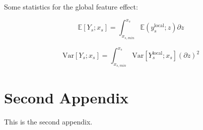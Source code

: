 \documentclass[wcp]{jmlr}
\newcommand{\Ysloc}{Y_{s}^{\text{local}}}
\newcommand{\ysloc}{y_{s}^{\text{local}}}
\newcommand{\E}{\mathbb{E}}
\newcommand{\var}{\mathrm{Var}}
\newcommand{\1}{\mathbbm{1}}
\begin{document}
Some statistics for the global feature effect:

\begin{equation}
  \E[Y_s ; x_s] = \int_{x_{s,min}}^{x_s} \E(\ysloc;z) \partial z
\end{equation}

\begin{equation}
  \var[Y_s ; x_s] = \int_{x_{s,min}}^{x_s} \var[ \Ysloc ; x_s] (\partial z)^2
\end{equation}


\section{Second Appendix}\label{apd:second}

This is the second appendix.
\end{document}
